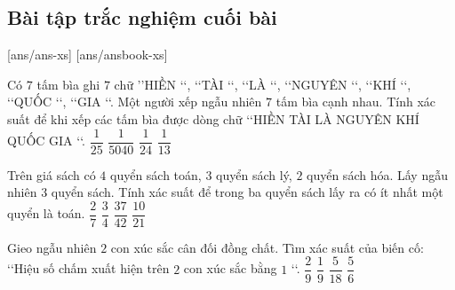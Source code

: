 \subsection{Bài tập trắc nghiệm cuối bài}
\setcounter{ex}{0}
[ans/ans-xs]
[ans/ansbook-xs]
\begin{ex}%
	Có $7$ tấm bìa ghi $7$ chữ \rq\rq HIỀN \lq\lq, \lq\lq TÀI \lq\lq, \lq\lq LÀ \lq\lq, \lq\lq NGUYÊN \lq\lq, \lq\lq KHÍ \lq\lq, \lq\lq QUỐC \lq\lq, \lq\lq GIA \lq\lq. Một người xếp ngẫu nhiên $7$ tấm bìa cạnh nhau. Tính xác suất để khi xếp các tấm bìa được dòng chữ \lq\lq HIỀN TÀI LÀ NGUYÊN KHÍ QUỐC GIA \lq\lq. 
	\choice
	{$\dfrac{1}{25}$}
	{\True $\dfrac{1}{5040}$}
	{$\dfrac{1}{24}$}
	{$\dfrac{1}{13}$}
\end{ex}

\begin{ex}%
	Trên giá sách có $4$ quyển sách toán, $3$ quyển sách lý, $2$ quyển sách hóa. Lấy ngẫu nhiên $3$ quyển sách. Tính xác suất để trong ba quyển sách lấy ra có ít nhất một quyển là toán. 
	\choice
	{$\dfrac{2}{7}$}
	{$\dfrac{3}{4}$}
	{\True $\dfrac{37}{42}$}
	{$\dfrac{10}{21}$}
\end{ex}

\begin{ex}%
	Gieo ngẫu nhiên $2$ con xúc sắc cân đối đồng chất. Tìm xác suất của biến cố$\colon$ \lq\lq Hiệu số chấm xuất hiện trên $2$ con xúc sắc bằng $1$ \lq\lq. 
	\choice
	{$\dfrac{2}{9}$}
	{$\dfrac{1}{9}$}
	{\True $\dfrac{5}{18}$}
	{$\dfrac{5}{6}$}
\end{ex}

